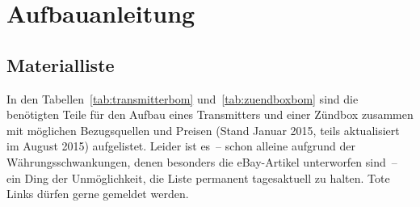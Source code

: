 \documentclass[pdftex, parskip, numbers=noenddot, toc=listof]{scrbook}
\begin{document}
	\part{Aufbauanleitung}

	\chapter{Materialliste}

	In den Tabellen~\ref{tab:transmitterbom} und~\ref{tab:zuendboxbom} sind die benötigten Teile für den Aufbau eines Transmitters und einer Zündbox zusammen mit möglichen Bezugsquellen und Preisen (Stand Januar 2015, teils aktualisiert im August 2015) aufgelistet. Leider ist es~-- schon alleine aufgrund der Währungsschwankungen, denen besonders die eBay-Artikel unterworfen sind~-- ein Ding der Unmöglichkeit, die Liste permanent tagesaktuell zu halten. Tote Links dürfen gerne gemeldet werden.
\end{document}
